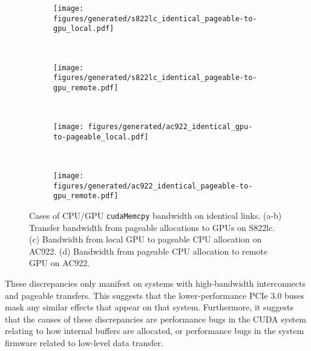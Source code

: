 \begin{figure}[ht]
	\centering
	\begin{subfigure}[b]{0.31\textwidth}
		\texttt{[image: figures/generated/s822lc\_identical\_pageable-to-gpu\_local.pdf]}
		\caption{}
		\label{fig:explicit-identical-s822lc-local}
	\end{subfigure}
	~
	\begin{subfigure}[b]{0.31\textwidth}
		\texttt{[image: figures/generated/s822lc\_identical\_pageable-to-gpu\_remote.pdf]}
		\caption{}
		\label{fig:explicit-identical-s822lc-remote}
	\end{subfigure}
	\\
	\begin{subfigure}[b]{0.31\textwidth}
		\texttt{[image: figures/generated/ac922\_identical\_gpu-to-pageable\_local.pdf]}
		\caption{}
		\label{fig:explicit-identical-ac922-local}
	\end{subfigure}
	~
	\begin{subfigure}[b]{0.31\textwidth}
		\texttt{[image: figures/generated/ac922\_identical\_pageable-to-gpu\_remote.pdf]}
		\caption{}
		\label{fig:explicit-identical-ac922-remote}
	\end{subfigure}
	\caption[CPU/GPU \texttt{cudaMemcpy} bandwidth on identical links]{
		Cases of CPU/GPU \texttt{cudaMemcpy} bandwidth on identical links.
		(a-b) Transfer bandwidth from pageable allocations to GPUs on S822lc.
		(c) Bandwidth from local GPU to pageable CPU allocation on AC922.
		(d) Bandwidth from pageable CPU allocation to remote GPU on AC922.
	}
	\label{fig:explicit-identical}
\end{figure}

These discrepancies only manifest on systems with high-bandwidth interconnects and pageable transfers.
This suggests that the lower-performance PCIe 3.0 buses mask any similar effects that appear on that system.
Furthermore, it suggests that the causes of these discrepancies are performance bugs in the CUDA system relating to how internal buffers are allocated, or performance bugs in the system firmware related to low-level data transfer.

